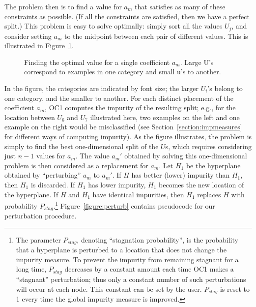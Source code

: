 The problem then is to find a value for $a_m$ that satisfies as many of
these constraints as possible.  (If all the constraints are satisfied,
then we have a perfect split.)  This problem is easy to solve optimally:
simply sort all the values $U_j$, and consider setting $a_m$ to
the midpoint between each pair of different values.  This is illustrated in
Figure~\ref{figure:1Dsplit}.
\begin{figure}
\vspace{1.0in}
\caption{Finding the optimal value for a single coefficient $a_m$.  Large
U's correspond to examples in one category and small u's to another.}
\label{figure:1Dsplit}
\vspace*{-.2in} 
\end{figure}
In the figure, the categories are indicated by font size; the larger
$U_i$'s belong to one category, and the smaller to another.  For each
distinct placement of the coefficient $a_m$, OC1 computes the impurity
of the resulting split; e.g., for the location between $U_6$ and $U_7$
illustrated here, two examples on the left and one example on the
right would be misclassified (see Section~\ref{section:impmeasures}
for different ways of computing impurity).  As the figure illustrates,
the problem is simply to find the best one-dimensional split of the
$U$s, which requires considering just $n-1$ values for $a_m$.  The
value $a_m'$ obtained by solving this one-dimensional problem is
then considered as a replacement for $a_m$. Let $H_1$ be the
hyperplane obtained by ``perturbing'' $a_m$ to $a_m'$.  If $H$ has
better (lower) impurity than $H_1$, then $H_1$ is discarded. If $H_1$
has lower impurity, $H_1$ becomes the new location of the hyperplane.
If $H$ and $H_1$ have identical impurities, then $H_1$ replaces $H$
with probability $P_{stag}$.\footnote{The parameter $P_{stag}$,
denoting ``stagnation probability'', is the probability that a
hyperplane is perturbed to a location that does not change the
impurity measure.  To prevent the impurity from remaining stagnant for
a long time, $P_{stag}$ decreases by a constant amount each time OC1
makes a ``stagnant'' perturbation; thus only a constant number of
such perturbations will occur at each node.  This constant can be set
by the user.  $P_{stag}$ is reset to 1 every time the global impurity
measure is improved.} Figure~\ref{figure:perturb} contains pseudocode
for our perturbation procedure.
